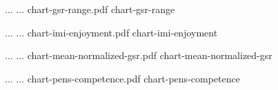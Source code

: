 \img
{...}
{...}
{chart-gsr-range.pdf}
{chart-gsr-range}

\img
{...}
{...}
{chart-imi-enjoyment.pdf}
{chart-imi-enjoyment}

\img
{...}
{...}
{chart-mean-normalized-gsr.pdf}
{chart-mean-normalized-gsr}

\img
{...}
{...}
{chart-pens-competence.pdf}
{chart-pens-competence}






